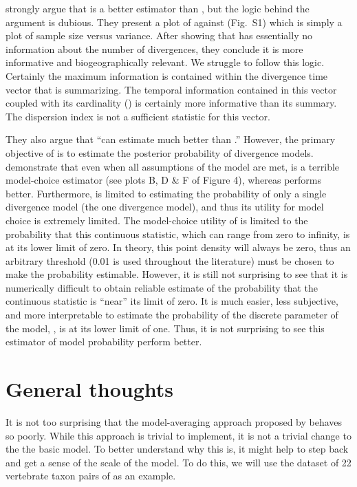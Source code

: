\documentclass[letterpaper,12pt]{article}
\begin{document}
\begin{linenumbers}
\citet{Hickerson2013} strongly argue that \vmratio{} is a better estimator than
\numt{}, but the logic behind the argument is dubious.
They present a plot of \numt{} against \vmratio{} (Fig.~S1) which is simply a
plot of sample size versus variance.
After showing that \vmratio{} has essentially no information about the
number of divergences, they conclude it is more informative and biogeographically
relevant.
We struggle to follow this logic.
Certainly the maximum information is contained within the divergence time
vector that \vmratio{} is summarizing.
The temporal information contained in this vector coupled with its cardinality
(\numt{}) is certainly more informative than its summary.
The dispersion index is not a sufficient statistic for this vector.

They also argue that ``\msb can estimate \vmratio{} much better than \numt{}.''
However, the primary objective of \msb is to estimate the posterior probability
of divergence models.
\citet{Oaks2012} demonstrate that even when all assumptions of the model are
met, \vmratio is a terrible model-choice estimator (see plots B, D \& F of
Figure 4), whereas \numt{} performs better.
Furthermore, \vmratio{} is limited to estimating the probability of only a
single divergence model (the one divergence model), and thus its utility for
model choice is extremely limited.
The model-choice utility of \vmratio{} is limited to the probability that
this continuous statistic, which can range from zero to infinity, is at its lower
limit of zero. In theory, this point density will always be zero, thus an
arbitrary threshold (0.01 is used throughout the \msb literature) must 
be chosen to make the probability estimable.
However, it is still not surprising to see that it is numerically difficult to
obtain reliable estimate of the probability that the continuous \vmratio{}
statistic is ``near'' its limit of zero.
It is much easier, less subjective, and more interpretable to estimate
the probability of the discrete parameter of the model, \numt{}, is
at its lower limit of one.
Thus, it is not surprising to see this estimator of model probability
perform better.

\section*{General thoughts}
It is not too surprising that the model-averaging approach proposed by
\citet{Hickerson2013} behaves so poorly.
While this approach is trivial to implement, it is not a trivial change
to the the basic \msb model.
To better understand why this is, it might help to step back and get a
sense of the scale of the \msb model.
To do this, we will use the dataset of 22 vertebrate taxon pairs of
\citet{Oaks2012} as an example.


\end{linenumbers}
\end{document}
